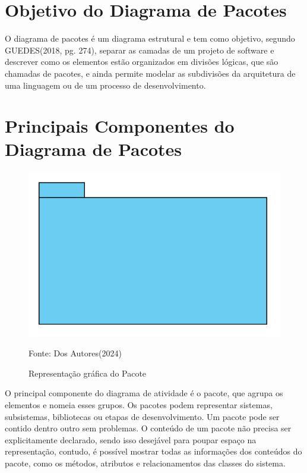 \documentclass[12pt,openright,oneside,a4paper,
	chapter=TITLE,
	section=TITLE,
	english,brazil]{abntex2}
\begin{document}
\section{Objetivo do Diagrama de Pacotes}

O diagrama de pacotes é um diagrama estrutural e tem como objetivo, segundo GUEDES(2018, pg. 274), separar as camadas de um projeto de software e descrever como os elementos estão organizados em divisões lógicas, que são chamadas de pacotes, e ainda permite modelar as subdivisões da arquitetura de uma linguagem ou de um processo de desenvolvimento.

\section{Principais Componentes do Diagrama de Pacotes}

\begin{figure}
	\caption{Representação gráfica do Pacote}
	\centering
	\includegraphics[scale=0.5]{img/Pacote.png}
	\\

	\label{ElementoPacote}
	\footnotesize\raggedright Fonte: Dos Autores(2024)
\end{figure}

O principal componente do diagrama de atividade é o pacote, que agrupa os elementos e nomeia esses grupos. Os pacotes podem representar sistemas, subsistemas, bibliotecas ou etapas de desenvolvimento. Um pacote pode ser contido dentro outro sem problemas. O conteúdo de um pacote não precisa ser explicitamente declarado, sendo isso desejável para poupar espaço na representação, contudo, é possível mostrar todas as informações dos conteúdos do pacote, como os métodos, atributos e relacionamentos das classes do sistema.
\end{document}
